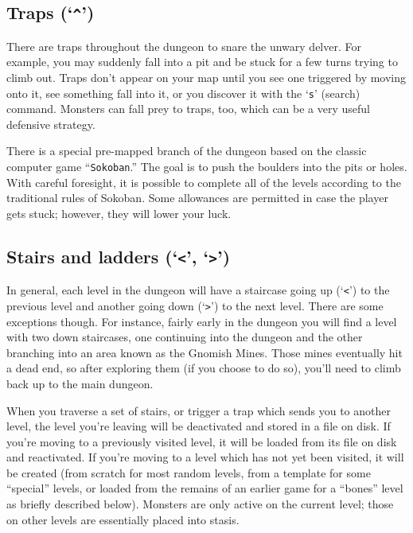 \subsection*{Traps (`{\tt \^{}}')}

There are traps throughout the dungeon to snare the unwary delver.
For example, you may suddenly fall into a pit and be stuck for a few
turns trying to climb out.  Traps don't appear on your map until you
see one triggered by moving onto it, see something fall into it, or you
discover it with the `{\tt s}' (search) command.  Monsters can fall prey to
traps, too, which can be a very useful defensive strategy.

There is a special pre-mapped branch of the dungeon based on the
classic computer game ``{\tt Sokoban}.''  The goal is to push the boulders
into the pits or holes.  With careful foresight, it is possible to
complete all of the levels according to the traditional rules of
Sokoban.  Some allowances are permitted in case the player gets stuck;
however, they will lower your luck.

\subsection*{Stairs and ladders (`{\tt <}', `{\tt >}')}

In general, each level in the dungeon will have a staircase going up
(`{\tt <}') to the previous level and another going down (`{\tt >}')
to the next
level.  There are some exceptions though.  For instance, fairly early
in the dungeon you will find a level with two down staircases, one
continuing into the dungeon and the other branching into an area
known as the Gnomish Mines.  Those mines eventually hit a dead end,
so after exploring them (if you choose to do so), you'll need to
climb back up to the main dungeon.

When you traverse a set of stairs, or trigger a trap which sends you
to another level, the level you're leaving will be deactivated and
stored in a file on disk.  If you're moving to a previously visited
level, it will be loaded from its file on disk and reactivated.  If
you're moving to a level which has not yet been visited, it will be
created (from scratch for most random levels, from a template for
some ``special'' levels, or loaded from the remains of an earlier game
for a ``bones'' level as briefly described below).  Monsters are only
active on the current level; those on other levels are essentially
placed into stasis.

